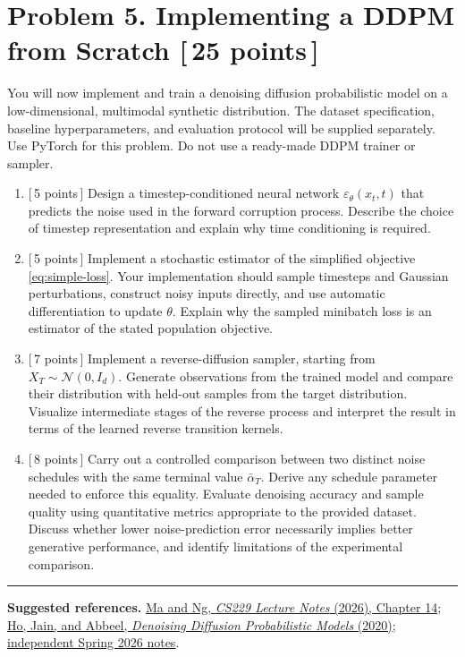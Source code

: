 \documentclass[11pt]{article}
\newcommand{\N}{\mathcal{N}}
\newcommand{\pts}[1]{\hfill\textnormal{[\,#1 points\,]}}
\begin{document}
\newpage
\section*{Problem 5. Implementing a DDPM from Scratch \pts{25}}

You will now implement and train a denoising diffusion probabilistic model on a
low-dimensional, multimodal synthetic distribution. The dataset specification,
baseline hyperparameters, and evaluation protocol will be supplied separately.
Use PyTorch for this problem. Do not use a ready-made DDPM trainer or sampler.

\begin{enumerate}
  \item \pts{5} Design a timestep-conditioned neural network
  \(\varepsilon_\theta(x_t,t)\) that predicts the noise used in the forward
  corruption process. Describe the choice of timestep representation and explain
  why time conditioning is required.

  \item \pts{5} Implement a stochastic estimator of the simplified objective
  \eqref{eq:simple-loss}. Your implementation should sample timesteps and Gaussian
  perturbations, construct noisy inputs directly, and use automatic differentiation
  to update \(\theta\). Explain why the sampled minibatch loss is an estimator
  of the stated population objective.

  \item \pts{7} Implement a reverse-diffusion sampler, starting from
  \(X_T\sim\N(0,I_d)\). Generate observations from the trained model and
  compare their distribution with held-out samples from the target distribution.
  Visualize intermediate stages of the reverse process and interpret the result
  in terms of the learned reverse transition kernels.

  \item \pts{8} Carry out a controlled comparison between two distinct noise
  schedules with the same terminal value \(\bar\alpha_T\). Derive any schedule
  parameter needed to enforce this equality. Evaluate denoising accuracy and
  sample quality using quantitative metrics appropriate to the provided dataset.
  Discuss whether lower noise-prediction error necessarily implies better
  generative performance, and identify limitations of the experimental comparison.
\end{enumerate}

\vspace{0.6em}
\hrule
\vspace{0.6em}
{\small
\textbf{Suggested references.}
\href{https://cs229.stanford.edu/main_notes.pdf}{Ma and Ng, \emph{CS229 Lecture Notes} (2026), Chapter 14};
\href{https://arxiv.org/abs/2006.11239}{Ho, Jain, and Abbeel, \emph{Denoising Diffusion Probabilistic Models} (2020)};
\href{https://github.com/az9713/cs229-machine-learning-notes}{independent Spring 2026 notes}.
}
\end{document}
